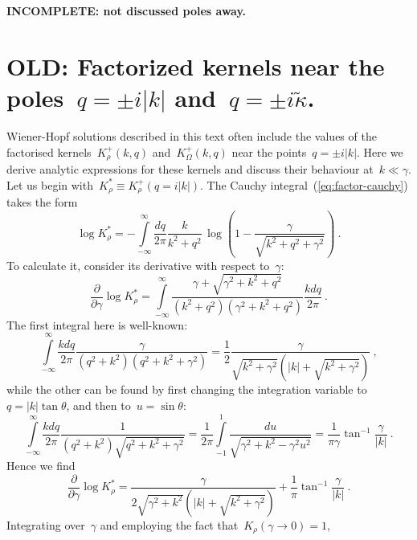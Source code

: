 \documentclass[preprint,aps,eqsecnum]{revtex4-1}
\newcommand{\fplus}[1]{{#1}^{+}}
\begin{document}
\textbf{INCOMPLETE: not discussed poles away.}

\section{OLD: Factorized kernels near the poles~$q = \pm i|k|$ and~$q = \pm i {\tilde \kappa}$.}
\label{sec:appendix-kstar}
Wiener-Hopf solutions described in this text often include the values of the
factorised kernels~$\fplus{K}_\rho(k, q)$ and~$\fplus{K}_\Omega(k, q)$ near
the points~$q = \pm i|k|$. Here we derive analytic expressions for these kernels
and discuss their behaviour at~$k \ll \gamma$. Let us begin
with~$K_\rho^\ast \equiv \fplus{K}_\rho(q = i|k|)$. The Cauchy
integral~(\ref{eq:factor-cauchy}) takes the form
\begin{equation}
  \log K_\rho^\ast = - \int\limits_{-\infty}^{\infty}\frac{dq}{2\pi} \frac{k}{k^2 + q^2}
  \, \log\left(1 - \frac{\gamma}{\sqrt{k^2 + q^2 + \gamma^2}}\right)
  \ .
\end{equation}
To calculate it, consider its derivative with respect to~$\gamma$:
\begin{equation}
  \frac{\partial}{\partial \gamma} \log K_\rho^\ast
  = \int\limits_{-\infty}^{\infty}
  \frac{\gamma + \sqrt{\gamma^2 + k^2 + q^2}}{(k^2 + q^2)(\gamma^2 + k^2 + q^2)}
  \frac{kdq}{2\pi}
  \ .
\end{equation}
The first integral here is well-known:
\begin{equation}
\int\limits_{-\infty}^{\infty} \frac{k dq}{2\pi} \frac{\gamma}{(q^2 + k^2)(q^2 + k^2 + \gamma^2)}
 = \frac{1}{2} \frac{\gamma}{\sqrt{k^2 + \gamma^2}(|k| + \sqrt{k^2 + \gamma^2})}
 \ ,
\end{equation}
while the other can be found by first changing the integration variable
to~$q = |k|\tan\theta$, and then to~$u = \sin\theta$:
\begin{equation}
  \int\limits_{-\infty}^{\infty} \frac{kdq}{2\pi}
  \frac{1}{(q^2 + k^2)\sqrt{q^2 + k^2 + \gamma^2}}
  = \frac{1}{2\pi}\int\limits_{-1}^{1} \frac{du}{\sqrt{\gamma^2 + k^2 - \gamma^2 u^2}}
   = \frac{1}{\pi\gamma} \tan^{-1}\frac{\gamma}{|k|}
  \ .
\end{equation}
Hence we find
\begin{equation}
  \frac{\partial}{\partial \gamma} \log K_\rho^\ast =
  \frac{\gamma}{2\sqrt{\gamma^2 + k^2}(|k| + \sqrt{k^2 + \gamma^2})}
  + \frac{1}{\pi} \tan^{-1}\frac{\gamma}{|k|}
  \ .
\end{equation}
Integrating over~$\gamma$ and employing the fact that~$K_\rho (\gamma \to 0) = 1$,
\end{document}
